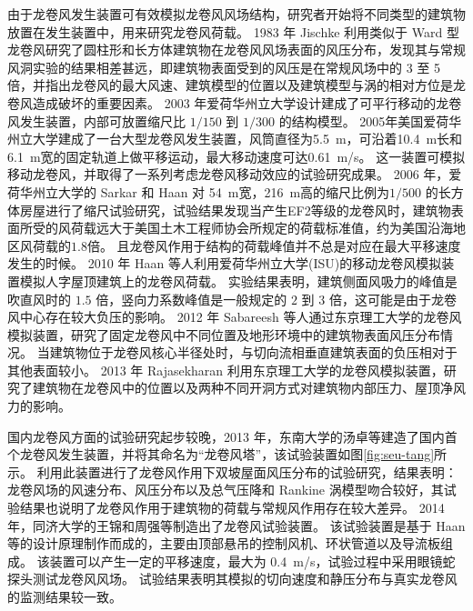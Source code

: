 由于龙卷风发生装置可有效模拟龙卷风风场结构，研究者开始将不同类型的建筑物放置在发生装置中，用来研究龙卷风荷载。
1983 年 Jischke \cite{jischke1983laboratory}利用类似于 Ward 型龙卷风研究了圆柱形和长方体建筑物在龙卷风风场表面的风压分布，发现其与常规风洞实验的结果相差甚远，即建筑物表面受到的风压是在常规风场中的 3 至 5 倍，并指出龙卷风的最大风速、建筑模型的位置以及建筑模型与涡的相对方位是龙卷风造成破坏的重要因素。
2003 年爱荷华州立大学设计建成了可平行移动的龙卷风发生装置，内部可放置缩尺比 $1/150$ 到 $1/300$ 的结构模型。
2005年美国爱荷华州立大学建成了一台大型龙卷风发生装置，风筒直径为\SI{5.5}{m}，可沿着\SI{10.4}{m}长和\SI{6.1}{m}宽的固定轨道上做平移运动，最大移动速度可达\SI{0.61}{m/s}。
这一装置可模拟移动龙卷风，并取得了一系列考虑龙卷风移动效应的试验研究成果。
2006 年，爱荷华州立大学的 Sarkar 和 Haan \cite{haan2009tornado}对 \SI{54}{m}宽，\SI{216}{m}高的缩尺比例为$1/500$ 的长方体房屋进行了缩尺试验研究，试验结果发现当产生EF2等级的龙卷风时，建筑物表面所受的风荷载远大于美国土木工程师协会所规定的荷载标准值，约为美国沿海地区风荷载的$1.8$倍。
且龙卷风作用于结构的荷载峰值并不总是对应在最大平移速度发生的时候。
2010 年 Haan \cite{haan2009tornado}等人利用爱荷华州立大学(ISU)的移动龙卷风模拟装置模拟人字屋顶建筑上的龙卷风荷载。
实验结果表明，建筑侧面风吸力的峰值是吹直风时的 $1.5$ 倍，竖向力系数峰值是一般规定的 $2$ 到 $3$ 倍，这可能是由于龙卷风中心存在较大负压的影响。
2012 年 Sabareesh 等人\cite{sabareesh2012dependence}通过东京理工大学的龙卷风模拟装置，研究了固定龙卷风中不同位置及地形环境中的建筑物表面风压分布情况。
当建筑物位于龙卷风核心半径处时，与切向流相垂直建筑表面的负压相对于其他表面较小。
2013 年 Rajasekharan \cite{rajasekharan2013characteristics}利用东京理工大学的龙卷风模拟装置，研究了建筑物在龙卷风中的位置以及两种不同开洞方式对建筑物内部压力、屋顶净风力的影响。

国内龙卷风方面的试验研究起步较晚，2013 年，东南大学的汤卓等建造了国内首个龙卷风发生装置，并将其命名为“龙卷风塔”，该试验装置如图\ref{fig:seu-tang}所示。
利用此装置进行了龙卷风作用下双坡屋面风压分布的试验研究，结果表明：
龙卷风场的风速分布、风压分布以及总气压降和 Rankine 涡模型吻合较好，其试验结果也说明了龙卷风作用于建筑物的荷载与常规风作用存在较大差异。
2014 年，同济大学的王锦和周强等\cite{wang2014tornado}制造出了龙卷风试验装置。
该试验装置是基于 Haan 等的设计原理制作而成的，主要由顶部悬吊的控制风机、环状管道以及导流板组成。
该装置可以产生一定的平移速度，最大为 \SI{0.4}{m/s}，试验过程中采用眼镜蛇探头测试龙卷风风场。
试验结果表明其模拟的切向速度和静压分布与真实龙卷风的监测结果较一致。

